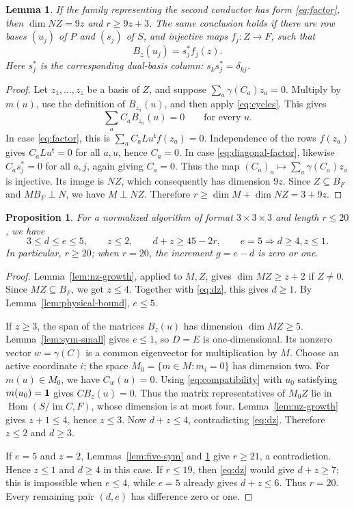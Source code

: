 \documentclass[11pt,a4paper]{article}
\numberwithin{equation}{section}
\theoremstyle{plain}
\newtheorem{lemma}[theorem]{Lemma}
\newtheorem{prop}[theorem]{Proposition}
\theoremstyle{definition}
\DeclareMathOperator{\im}{im}\DeclareMathOperator{\supp}{supp}
\DeclareMathOperator{\Hom}{Hom}\DeclareMathOperator{\diag}{diag}
\newcommand{\leqs}{\leqslant}\newcommand{\geqs}{\geqslant}
\begin{document}
\begin{lemma}\label{lem:injective-product}
If the family representing the second conductor has form
\eqref{eq:factor}, then $\dim NZ=9z$ and $r\geqs9z+3$.
The same conclusion holds if there are row bases $(u_j)$ of $P$ and
$(s_j)$ of $S$, and injective maps $f_j:Z\to F$, such that
\begin{equation}\label{eq:diagonal-factor}
 B_z(u_j)=s_j^*f_j(z).
\end{equation}
Here $s_j^*$ is the corresponding dual-basis column:
$s_k s_j^*=\delta_{kj}$.
\end{lemma}
\begin{proof}
Let $z_1,\ldots,z_z$ be a basis of $Z$, and suppose
$\sum_a\gamma(C_a)z_a=0$. Multiply by $m(u)$, use the definition of
$B_{z_a}(u)$, and then apply \eqref{eq:cycles}. This gives
\[
 \sum_a C_a B_{z_a}(u)=0\qquad\text{for every }u.
\]
In case \eqref{eq:factor}, this is $\sum_a C_a Lu^{\mathsf t}f(z_a)=0$.
Independence of the rows $f(z_a)$ gives $C_aLu^{\mathsf t}=0$ for
all $a,u$, hence $C_a=0$. In case \eqref{eq:diagonal-factor}, likewise
$C_a s_j^*=0$ for all $a,j$, again giving $C_a=0$.
Thus the map $(C_a)_a\mapsto\sum_a\gamma(C_a)z_a$ is injective.
Its image is $NZ$, which consequently has dimension $9z$.
Since $Z\subseteq B_F$ and $MB_F\perp N$, we have $M\perp NZ$.
Therefore $r\geqs\dim M+\dim NZ=3+9z$.
\end{proof}

\begin{prop}\label{prop:critical}
For a normalized algorithm of format $3\times3\times3$ and length
$r\leqs20$, we have
\[
 3\leqs d\leqs e\leqs5,\qquad z\leqs2,\qquad d+z\geqs45-2r,
 \qquad e=5\Longrightarrow d\geqs4, z\leqs1.
\]
In particular, $r\geqs20$; when $r=20$, the increment $g=e-d$ is zero
or one.
\end{prop}
\begin{proof}
Lemma~\ref{lem:nz-growth}, applied to $M,Z$, gives
$\dim MZ\geqs z+2$ if $Z\ne0$. Since $MZ\subseteq B_F$, we get
$z\leqs4$. Together with \eqref{eq:dz}, this gives $d\geqs1$.
By Lemma~\ref{lem:physical-bound}, $e\leqs5$.

If $z\geqs3$, the span of the matrices $B_z(u)$ has dimension
$\dim MZ\geqs5$. Lemma~\ref{lem:sym-small} gives $e\leqs1$, so
$D=E$ is one-dimensional. Its nonzero vector $w=\gamma(C)$ is a common
eigenvector for multiplication by $M$. Choose an active coordinate $i$;
the space $M_0=\{m\in M:m_i=0\}$ has dimension two.
For $m(u)\in M_0$, we have $C_w(u)=0$.
Using \eqref{eq:compatibility} with $u_0$ satisfying $m(u_0)=\mathbf1$
gives $CB_z(u)=0$. Thus the matrix representatives of $M_0Z$ lie in
$\Hom(S/\im C,F)$, whose dimension is at most four.
Lemma~\ref{lem:nz-growth} gives $z+1\leqs4$, hence $z\leqs3$.
Now $d+z\leqs4$, contradicting \eqref{eq:dz}. Therefore $z\leqs2$
and $d\geqs3$.

If $e=5$ and $z=2$, Lemmas~\ref{lem:five-sym} and
\ref{lem:injective-product} give $r\geqs21$, a contradiction.
Hence $z\leqs1$ and $d\geqs4$ in this case.
If $r\leqs19$, then \eqref{eq:dz} would give $d+z\geqs7$;
this is impossible when $e\leqs4$, while $e=5$ already gives
$d+z\leqs6$. Thus $r=20$. Every remaining pair $(d,e)$ has difference
zero or one.
\end{proof}
\end{document}
